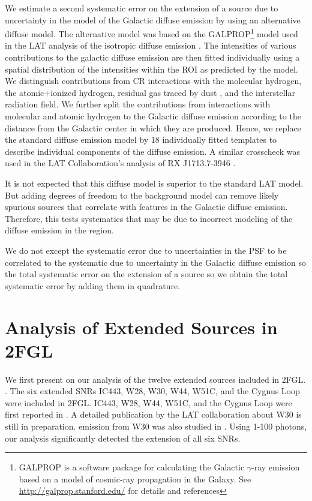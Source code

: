 \documentclass[12pt,preprint]{aastex}
\newcommand{\gev}{\text{GeV}\xspace}
\begin{document}

We estimate a second systematic error on the extension of a source
due to uncertainty in the model of the Galactic diffuse emission by
using an alternative diffuse model. The alternative model was based on
the GALPROP\footnote{GALPROP is a software package for calculating the
Galactic $\gamma$-ray emission based on a model of cosmic-ray propagation
in the Galaxy. See \url{http://galprop.stanford.edu/} for details and
references} model used in the LAT analysis of the isotropic diffuse
emission \citep{isotropic_lat}.  
The intensities of various contributions to the galactic
diffuse emission are then fitted individually using a spatial
distribution of the intensities within the ROI 
as predicted by the model.
We distinguish contributions from CR interactions with
the molecular hydrogen, the atomic+ionized hydrogen,
residual gas traced by dust \citep{isabelle_dark_gass},
and the interstellar radiation field. We further
split the contributions from interactions with molecular
and atomic hydrogen to the
Galactic diffuse emission according
to the distance from the Galactic center in
which they are produced. Hence, we replace
the standard diffuse emission model by 18
individually fitted templates to describe individual
components of the diffuse emission.
A similar crosscheck was used in the
LAT Collaboration's analysis of RX J1713.7-3946 \citep{rx_j1713_lat}.

It is not expected that this diffuse model is superior to the standard
LAT model.  But adding degrees of freedom to the background model can
remove likely spurious sources that correlate with features in the
Galactic diffuse emission.  Therefore, this tests systematics that may
be due to incorrect modeling of the diffuse emission in the region.

We do not except the systematic error due to uncertainties in the PSF to
be correlated to the systematic due to uncertainty in the Galactic diffuse
emission so the total systematic error on the extension of a source so
we obtain the total systematic error by adding them in quadrature.

\section{Analysis of Extended Sources in 2FGL}
\label{validate_known}


We first present on our analysis of the twelve extended sources
included in 2FGL.
\citep{second_cat}.
The six extended SNRs IC443, W28, W30, W44, W51C, and the
Cygnus Loop were included in 2FGL.  IC443, W28, W44, W51C, and the
Cygnus Loop were
first reported in \cite{ic443,w28,w44,w51c,cygnus_loop_lat}.  A
detailed publication by the LAT
collaboration about W30 is still in preparation.
\gev emission from W30 was also studied in \cite{castro_and_slane_2010}.
Using 1-100 \gev photons, our analysis significantly detected the
extension of all six SNRs.
\end{document}
